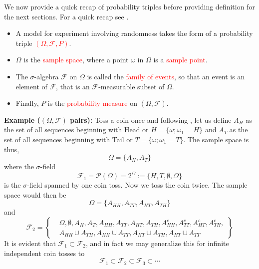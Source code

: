 \documentclass[10pt,handout,english]{beamer}
\newcommand{\F}{\mathcal{F}}
\newcommand{\1}{\mathbbm{1}}
\begin{document}
\begin{frame}[allowframebreaks]
We now provide a quick recap of probability triples before providing definition for the next sections. For a quick recap see \citet{williams1991probability}.\justifying
\begin{itemize}
\setlength\itemsep{0.5em}
\item A model for experiment involving randomness takes the form of a probability triple \textcolor{red}{$(\Omega,\F,P)$}.
\item $\Omega$ is the \textcolor{red}{sample space}, where a point $\omega$ in $\Omega$ is a \textcolor{red}{sample point}.
\item The $\sigma$-algebra $\F$ on $\Omega$ is called the \textcolor{red}{family of events}, so that an event is an element of $\F$, that is an $\F$-measurable subset of $\Omega$.
\item Finally, $P$ is the \textcolor{red}{probability measure} on $(\Omega,\F)$.
\end{itemize}
\textbf{Example ($(\Omega,\F)$ pairs):}   Toss a coin once and following \citet{shreve2004stochastic}, let us define $A_H$ as the set of all sequences beginning with Head or $H=\{\omega;\omega_1=H\}$ and $A_T$ as the set of all sequences beginning with Tail or $T=\{\omega;\omega_1=T\}$. The sample space is thus, 
\[
\Omega=\{A_H,A_T\}
\]
where the $\sigma$-field 
\[
\F_1=\mathcal{P}(\Omega)=2^\Omega:=\{H,T,\emptyset,\Omega\}
\]
is the $\sigma$-field spanned by one coin toss. Now we toss the coin twice. The sample space would then be
\[
\Omega=\{A_{HH},A_{TT},A_{HT},A_{TH}\}
\]
and 
\begin{equation*}
\F_2=\left\{
\!\begin{aligned}
&\Omega,\emptyset,A_{H},A_{T},A_{HH},A_{TT},A_{HT},A_{TH},A^c_{HH},A^c_{TT},A^c_{HT},A^c_{TH},\\
&A_{HH}\cup A_{TH},A_{HH}\cup A_{TT},A_{HT}\cup A_{TH},A_{HT}\cup A_{TT}
\end{aligned}
\right\}
\end{equation*}
It is evident that $\F_1\subset\F_2$, and in fact we may generalize this for infinite independent coin tosses to
\[
\F_1\subset \F_2\subset\F_3\subset\cdots
\]
\end{frame}
\end{document}
